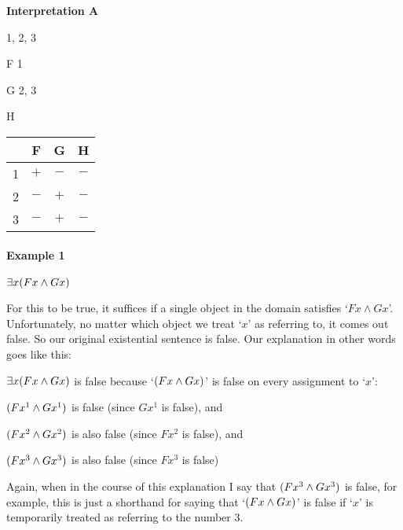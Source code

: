 \begin{minipage}{\textwidth}
\begin{center}
\textbf{Interpretation A}
\begin{multicols}{2}
	\begin{ekey}
		\item[\text{Domain}] 1, 2, 3
		\item[F] 1
		\item[G] 2, 3
		\item[H]
	\end{ekey}
\columnbreak

\begin{center}\begin{tabular}{|c|c|c|c|}
\hline
    &   F   &   G  & H  \\ \hline
1   &   $+$   &   $-$  & $-$  \\ \hline
2   &   $-$   &   $+$ & $-$ \\ \hline
3   &   $-$   &   $+$ & $-$ \\ \hline
\end{tabular}\end{center}
\end{multicols}
\end{center}
\end{minipage}


\paragraph{Example 1} $\exists x(Fx \wedge Gx)$

\noindent For this to be true, it suffices if a single object in the domain satisfies `$Fx \land Gx$'.  Unfortunately, no matter which object we treat `$x$' as referring to, it comes out false.  So our original existential sentence is false.  Our explanation in other words goes like this:

\begin{etriangle}
\item $\exists x(Fx \wedge Gx)$ is false because `$(Fx \wedge Gx)$' is false on every assignment to `$x$':
\begin{etriangle}
\item $(Fx^1 \wedge Gx^1)$ is false (since $Gx^1$ is false), and
\item $(Fx^2 \wedge Gx^2)$ is also false (since $Fx^2$ is false), and
\item $(Fx^3 \wedge Gx^3)$ is also false (since $Fx^3$ is false)
\end{etriangle}
\end{etriangle}
Again, when in the course of this explanation I say that $(Fx^3 \wedge Gx^3)$ is false,  for example, this is just a shorthand for saying that `$(Fx \wedge Gx)$' is false if `$x$' is temporarily treated as referring to the number 3.

